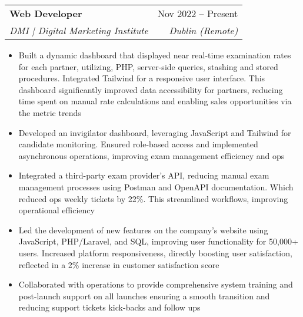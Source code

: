 \documentclass[letterpaper,11pt]{article}
\makeatletter
\newcommand{\resumeItem}[1]{
  \item\small{
    {#1 \vspace{-2pt}}
  }
}
\newcommand{\resumeSubheading}[4]{
  \vspace{-2pt}\item
    \begin{tabular*}{0.97\textwidth}[t]{l@{\extracolsep{\fill}}r}
      \textbf{#1} & #2 \\
      \textit{\small#3} & \textit{\small #4} \\
    \end{tabular*}\vspace{-7pt}
}
\newcommand{\resumeSubSubheading}[2]{
    \item
    \begin{tabular*}{0.97\textwidth}{l@{\extracolsep{\fill}}r}
      \textit{\small#1} & \textit{\small #2} \\
    \end{tabular*}\vspace{-7pt}
}
\newcommand{\resumeSubHeadingListEnd}{\end{itemize}}
\newcommand{\resumeItemListStart}{\begin{itemize}}
\newcommand{\resumeItemListEnd}{\end{itemize}\vspace{-5pt}}
\makeatother
\begin{document}
    \resumeSubheading
      {Web Developer}{Nov 2022 -- Present}
      {DMI | Digital Marketing Institute}{Dublin (Remote)}
      \resumeItemListStart
      \resumeItem{Built a dynamic dashboard that displayed near real-time examination rates for each partner, utilizing, PHP, server-side queries, stashing and stored procedures. Integrated Tailwind for a responsive user interface. This dashboard significantly improved data accessibility for partners, reducing time spent on manual rate calculations and enabling sales opportunities via the metric trends}
      \resumeItem{Developed an invigilator dashboard, leveraging JavaScript and Tailwind for candidate monitoring. Ensured role-based access and implemented asynchronous operations, improving exam management efficiency and ops}
        \resumeItem{Integrated a third-party exam provider's API, reducing manual exam management processes using Postman and OpenAPI documentation. Which reduced ops weekly tickets by 22\%. This streamlined workflows, improving operational efficiency}
        \resumeItem{Led the development of new features on the company’s website using JavaScript, PHP/Laravel, and SQL, improving user functionality for 50,000+ users. Increased platform responsiveness, directly boosting user satisfaction, reflected in a 2\% increase in customer satisfaction score}
        \resumeItem{Collaborated with operations to provide comprehensive system training and post-launch support on all launches ensuring a smooth transition and reducing support tickets kick-backs and follow ups}
        \linebreak[4]
      \resumeItemListEnd
      
\end{document}
